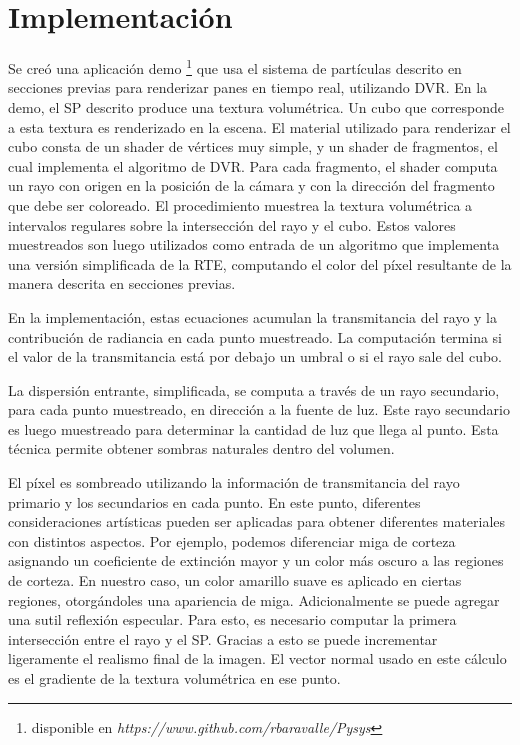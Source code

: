 \section{Implementación}

Se creó una aplicación demo \footnote{disponible en \emph{https://www.github.com/rbaravalle/Pysys}}  que usa el sistema de partículas descrito en secciones previas para renderizar panes en tiempo real, utilizando DVR.
En la demo, el SP descrito produce una textura volumétrica.
Un cubo que corresponde a esta textura es renderizado en la escena.
El material utilizado para renderizar el cubo consta de un shader de vértices muy simple, y un shader de fragmentos, el cual implementa el algoritmo de DVR.
Para cada fragmento, el shader computa un rayo con origen en la posición de la cámara y con la dirección del fragmento que debe ser coloreado.
El procedimiento muestrea la textura volumétrica a intervalos regulares sobre la intersección del rayo y el cubo.
Estos valores muestreados son luego utilizados como entrada de un algoritmo que implementa una versión simplificada de la RTE, computando el color del píxel resultante de la manera descrita en secciones previas.

En la implementación, estas ecuaciones acumulan la transmitancia del rayo y la contribución de radiancia en cada punto muestreado.
La computación termina si el valor de la transmitancia está por debajo un umbral o si el rayo sale del cubo.

La dispersión entrante, simplificada, se computa a través de un rayo secundario, para cada punto muestreado, en dirección a la fuente de luz.
Este rayo secundario es luego muestreado para determinar la cantidad de luz que llega al punto.
Esta técnica permite obtener sombras naturales dentro del volumen.

El píxel es sombreado utilizando la información de transmitancia del rayo primario y los secundarios en cada punto.
En este punto, diferentes consideraciones artísticas pueden ser aplicadas para obtener diferentes materiales con distintos aspectos.
Por ejemplo, podemos diferenciar miga de corteza asignando un coeficiente de extinción mayor y un color más oscuro a las regiones de corteza.
En nuestro caso, un color amarillo suave es aplicado en ciertas regiones, otorgándoles una apariencia de miga.
Adicionalmente se puede agregar una sutil reflexión especular.
Para esto, es necesario computar la primera intersección entre el rayo y el SP.
Gracias a esto se puede incrementar ligeramente el realismo final de la imagen.
El vector normal usado en este cálculo es el gradiente de la textura volumétrica en ese punto.

